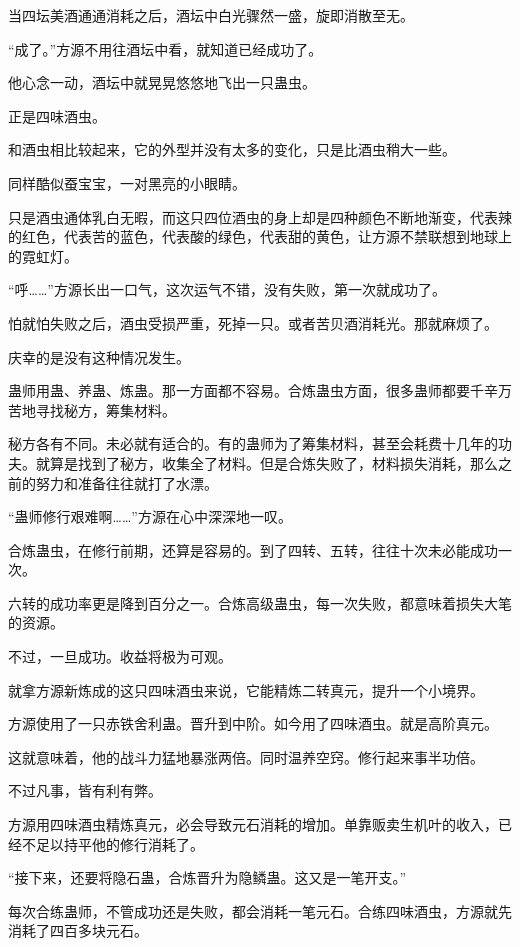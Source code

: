 \begin{this_body}
当四坛美酒通通消耗之后，酒坛中白光骤然一盛，旋即消散至无。

“成了。”方源不用往酒坛中看，就知道已经成功了。

他心念一动，酒坛中就晃晃悠悠地飞出一只蛊虫。

正是四味酒虫。

和酒虫相比较起来，它的外型并没有太多的变化，只是比酒虫稍大一些。

同样酷似蚕宝宝，一对黑亮的小眼睛。

只是酒虫通体乳白无暇，而这只四位酒虫的身上却是四种颜色不断地渐变，代表辣的红色，代表苦的蓝色，代表酸的绿色，代表甜的黄色，让方源不禁联想到地球上的霓虹灯。

“呼……”方源长出一口气，这次运气不错，没有失败，第一次就成功了。

怕就怕失败之后，酒虫受损严重，死掉一只。或者苦贝酒消耗光。那就麻烦了。

庆幸的是没有这种情况发生。

蛊师用蛊、养蛊、炼蛊。那一方面都不容易。合炼蛊虫方面，很多蛊师都要千辛万苦地寻找秘方，筹集材料。

秘方各有不同。未必就有适合的。有的蛊师为了筹集材料，甚至会耗费十几年的功夫。就算是找到了秘方，收集全了材料。但是合炼失败了，材料损失消耗，那么之前的努力和准备往往就打了水漂。

“蛊师修行艰难啊……”方源在心中深深地一叹。

合炼蛊虫，在修行前期，还算是容易的。到了四转、五转，往往十次未必能成功一次。

六转的成功率更是降到百分之一。合炼高级蛊虫，每一次失败，都意味着损失大笔的资源。

不过，一旦成功。收益将极为可观。

就拿方源新炼成的这只四味酒虫来说，它能精炼二转真元，提升一个小境界。

方源使用了一只赤铁舍利蛊。晋升到中阶。如今用了四味酒虫。就是高阶真元。

这就意味着，他的战斗力猛地暴涨两倍。同时温养空窍。修行起来事半功倍。

不过凡事，皆有利有弊。

方源用四味酒虫精炼真元，必会导致元石消耗的增加。单靠贩卖生机叶的收入，已经不足以持平他的修行消耗了。

“接下来，还要将隐石蛊，合炼晋升为隐鳞蛊。这又是一笔开支。”

每次合练蛊师，不管成功还是失败，都会消耗一笔元石。合练四味酒虫，方源就先消耗了四百多块元石。


\end{this_body}
